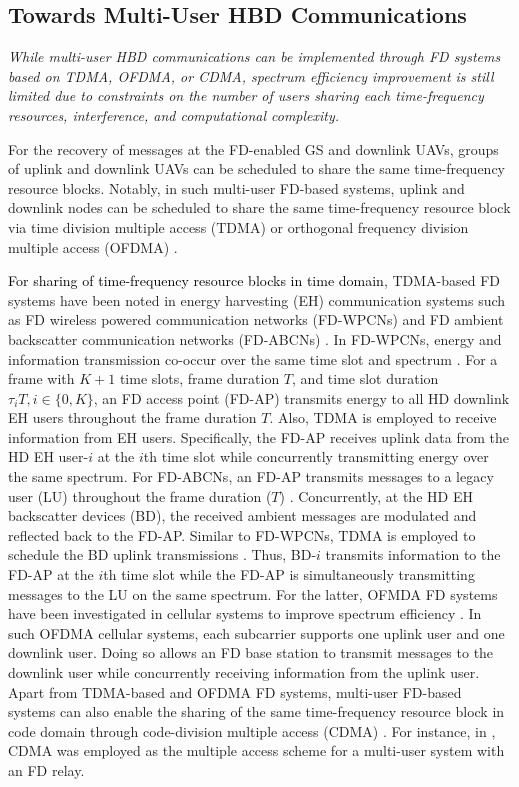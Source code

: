 \subsection{Towards Multi-User HBD Communications}

\begin{summary}
\emph{
\emph{While multi-user HBD communications can be implemented through FD systems based on TDMA, OFDMA, or CDMA, spectrum efficiency improvement is still limited due to constraints on the number of users sharing each time-frequency resources, interference, and computational complexity.}
}
\end{summary}

For the recovery of messages at the FD-enabled GS and downlink UAVs, groups of uplink and downlink UAVs can be scheduled to share the same time-frequency resource blocks. Notably, in such multi-user FD-based systems, uplink and downlink nodes can be scheduled to share the same time-frequency resource block via time division multiple access (TDMA) or orthogonal frequency division multiple access (OFDMA) \cite{wang2015exploiting}. 

\textcolor{black}{For sharing of time-frequency resource blocks in time domain}, TDMA-based FD systems have been noted in energy harvesting (EH) communication systems such as FD wireless powered communication networks (FD-WPCNs) \cite{ju2014optimal, kang2015full} and FD ambient backscatter communication networks (FD-ABCNs) \cite{yang2019optimal}. In FD-WPCNs, energy and information transmission co-occur over the same time slot and spectrum \cite{ju2014optimal, kang2015full}. For a frame with $K+1$ time slots, frame duration $T$, and time slot duration $\tau_iT, i \in \{0, K\}$, an FD access point (FD-AP) transmits energy to all HD downlink EH users throughout the frame duration $T$. Also, TDMA is employed to receive information from EH users. Specifically, the FD-AP receives uplink data from the HD EH user-$i$ at the $i$th time slot while concurrently transmitting energy over the same spectrum. For FD-ABCNs, an FD-AP transmits messages to a legacy user (LU) throughout the frame duration ($T$) \cite{yang2019optimal}. Concurrently, at the HD EH backscatter devices (BD), the received ambient messages are modulated and reflected back to the FD-AP. Similar to FD-WPCNs, TDMA is employed to schedule the BD uplink transmissions \cite{yang2019optimal}. Thus, BD-$i$ transmits information to the FD-AP at the $i$th time slot while the FD-AP is simultaneously transmitting messages to the LU on the same spectrum. For the latter, OFMDA FD systems have been investigated in cellular systems to improve spectrum efficiency \cite{shao2014analysis,nam2015joint,di2016joint,zhang2019max}. In such OFDMA cellular systems, each subcarrier supports one uplink user and one downlink user. Doing so allows an FD base station to transmit messages to the downlink user while concurrently receiving information from the uplink user. Apart from TDMA-based and OFDMA FD systems, multi-user FD-based systems can also enable the sharing of the same time-frequency resource block in code domain through code-division multiple access (CDMA) \cite{chen2015physical}. For instance, in \cite{gao2014full}, CDMA was employed as the multiple access scheme for a multi-user system with an FD relay. 

